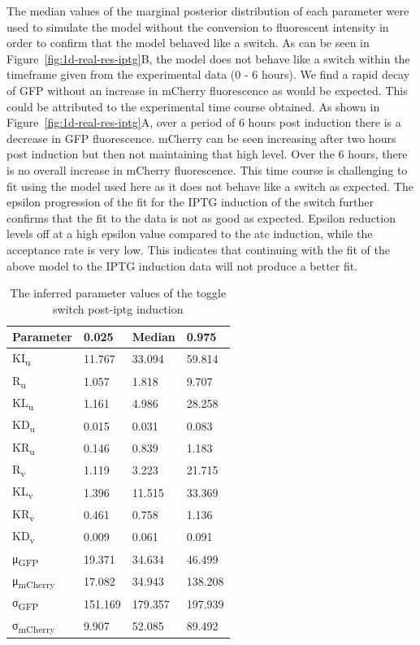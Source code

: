 The median values of the marginal posterior distribution of each parameter were used to simulate the model without the conversion to fluorescent intensity in order to confirm that the model behaved like a switch. As can be seen in Figure~\ref{fig:1d-real-res-iptg}B, the model does not behave like a switch within the timeframe given from the experimental data (0 - 6 hours). We find a rapid decay of GFP without an increase in mCherry fluorescence as would be expected. This could be attributed to the experimental time course obtained. As shown in Figure~\ref{fig:1d-real-res-iptg}A, over a period of 6 hours post induction there is a decrease in GFP fluorescence. mCherry can be seen increasing after two hours post induction but then not maintaining that high level. Over the 6 hours, there is no overall increase in mCherry fluorescence. This time course is challenging to fit using the model used here as it does not behave like a switch as expected. The epsilon progression of the fit for the IPTG induction of the switch further confirms that the fit to the data is not as good as expected. Epsilon reduction levels off at a high epsilon value compared to the \acrshort{atc} induction, while the acceptance rate is very low. This indicates that continuing with the fit of the above model to the IPTG induction data will not produce a better fit.   


\begin{table}[tb]
\centering
\caption{The inferred parameter values of the toggle switch post-\acrshort{iptg} induction}
\label{tab:inf_params_iptg}
\begin{tabular}{@{}llll@{}}
\toprule
Parameter & 0.025 & Median & 0.975 \\ \midrule
KI\textsubscript{u} & 11.767 & 33.094 & 59.814 \\
R\textsubscript{u} & 1.057 & 1.818 & 9.707 \\
KL\textsubscript{u} & 1.161 & 4.986 & 28.258 \\
KD\textsubscript{u} & 0.015 & 0.031 & 0.083 \\
KR\textsubscript{u} & 0.146 & 0.839 & 1.183 \\
R\textsubscript{v} & 1.119 & 3.223 & 21.715 \\
KL\textsubscript{v} & 1.396 & 11.515 & 33.369 \\
KR\textsubscript{v} & 0.461 & 0.758 & 1.136 \\
KD\textsubscript{v} & 0.009 & 0.061 & 0.091 \\
μ\textsubscript{GFP} & 19.371 & 34.634 & 46.499 \\
μ\textsubscript{mCherry} & 17.082 & 34.943 & 138.208\\
σ\textsubscript{GFP} & 151.169 & 179.357 & 197.939 \\
σ\textsubscript{mCherry} & 9.907 & 52.085 & 89.492 \\ \bottomrule
\end{tabular}
\end{table}


